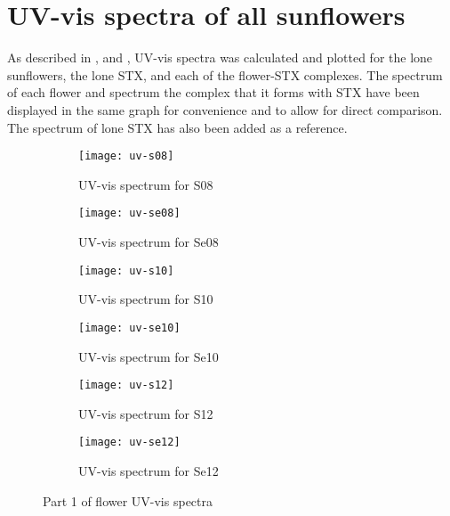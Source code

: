 \newpage
\section{UV-vis spectra of all sunflowers}

As described in ,  and , UV-vis spectra was calculated and plotted for the lone sunflowers, the lone STX, and each of the flower-STX complexes.
The spectrum of each flower and spectrum the complex that it forms with STX have been displayed in the same graph for convenience and to allow for direct comparison.
The spectrum of lone STX has also been added as a reference.

\begin{figure*}[h]
\centering
\begin{subfigure}{8.25cm}\centering\texttt{[image: uv-s08]}\caption{UV-vis spectrum for S08}\end{subfigure}%
\begin{subfigure}{8.25cm}\centering\texttt{[image: uv-se08]}\caption{UV-vis spectrum for Se08}\end{subfigure}
\begin{subfigure}{8.25cm}\centering\texttt{[image: uv-s10]}\caption{UV-vis spectrum for S10}\end{subfigure}%
\begin{subfigure}{8.25cm}\centering\texttt{[image: uv-se10]}\caption{UV-vis spectrum for Se10}\end{subfigure}
\begin{subfigure}{8.25cm}\centering\texttt{[image: uv-s12]}\caption{UV-vis spectrum for S12}\end{subfigure}%
\begin{subfigure}{8.25cm}\centering\texttt{[image: uv-se12]}\caption{UV-vis spectrum for Se12}\end{subfigure}
\caption[Part 1 of flower UV-vis spectra]{Part 1 of flower UV-vis spectra}
\end{figure*}

\newpage

